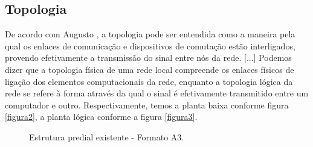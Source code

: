 \documentclass[	DIV=calc,%
							paper=a4,%
							fontsize=12pt,%
							onecolumn]{scrartcl}	 					%
\begin{document}

\subsection{Topologia}
De acordo com Augusto \cite{ID1}, a topologia pode ser entendida como a maneira pela qual os enlaces de comunicação e dispositivos de comutação estão interligados, provendo efetivamente a transmissão do sinal entre nós da rede. [...] Podemos dizer que a topologia física de uma rede local compreende os enlaces físicos de ligação dos elementos computacionais da rede, enquanto a topologia lógica da rede se refere à forma através da qual o sinal é efetivamente transmitido entre um computador e outro. Respectivamente, temos a planta baixa conforme figura \ref{figura2}, a planta lógica conforme a figura \ref{figura3}.



\clearpage
\thispagestyle{plain}

\recalctypearea

\begin{figure}
	\noindent{}
	\caption{Estrutura predial existente - Formato A3.}
	\label{figura1}
\end{figure}

\clearpage
{}
\recalctypearea



\end{document}
